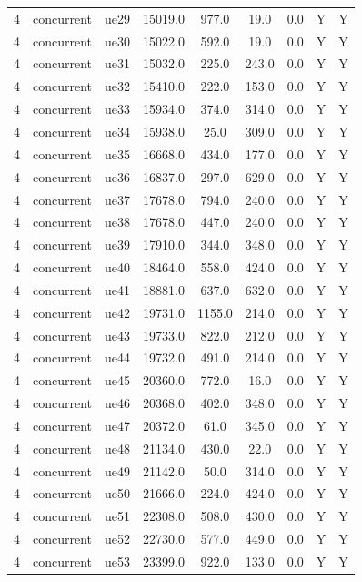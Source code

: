 \begin{table}[ht]
\begin{tabular}{|c|c|c|c|c|c|c|c|c|}
4 & concurrent & ue29 & 15019.0 & 977.0 & 19.0 & 0.0 & Y & Y \\
4 & concurrent & ue30 & 15022.0 & 592.0 & 19.0 & 0.0 & Y & Y \\
4 & concurrent & ue31 & 15032.0 & 225.0 & 243.0 & 0.0 & Y & Y \\
4 & concurrent & ue32 & 15410.0 & 222.0 & 153.0 & 0.0 & Y & Y \\
4 & concurrent & ue33 & 15934.0 & 374.0 & 314.0 & 0.0 & Y & Y \\
4 & concurrent & ue34 & 15938.0 & 25.0 & 309.0 & 0.0 & Y & Y \\
4 & concurrent & ue35 & 16668.0 & 434.0 & 177.0 & 0.0 & Y & Y \\
4 & concurrent & ue36 & 16837.0 & 297.0 & 629.0 & 0.0 & Y & Y \\
4 & concurrent & ue37 & 17678.0 & 794.0 & 240.0 & 0.0 & Y & Y \\
4 & concurrent & ue38 & 17678.0 & 447.0 & 240.0 & 0.0 & Y & Y \\
4 & concurrent & ue39 & 17910.0 & 344.0 & 348.0 & 0.0 & Y & Y \\
4 & concurrent & ue40 & 18464.0 & 558.0 & 424.0 & 0.0 & Y & Y \\
4 & concurrent & ue41 & 18881.0 & 637.0 & 632.0 & 0.0 & Y & Y \\
4 & concurrent & ue42 & 19731.0 & 1155.0 & 214.0 & 0.0 & Y & Y \\
4 & concurrent & ue43 & 19733.0 & 822.0 & 212.0 & 0.0 & Y & Y \\
4 & concurrent & ue44 & 19732.0 & 491.0 & 214.0 & 0.0 & Y & Y \\
4 & concurrent & ue45 & 20360.0 & 772.0 & 16.0 & 0.0 & Y & Y \\
4 & concurrent & ue46 & 20368.0 & 402.0 & 348.0 & 0.0 & Y & Y \\
4 & concurrent & ue47 & 20372.0 & 61.0 & 345.0 & 0.0 & Y & Y \\
4 & concurrent & ue48 & 21134.0 & 430.0 & 22.0 & 0.0 & Y & Y \\
4 & concurrent & ue49 & 21142.0 & 50.0 & 314.0 & 0.0 & Y & Y \\
4 & concurrent & ue50 & 21666.0 & 224.0 & 424.0 & 0.0 & Y & Y \\
4 & concurrent & ue51 & 22308.0 & 508.0 & 430.0 & 0.0 & Y & Y \\
4 & concurrent & ue52 & 22730.0 & 577.0 & 449.0 & 0.0 & Y & Y \\
4 & concurrent & ue53 & 23399.0 & 922.0 & 133.0 & 0.0 & Y & Y \\

\end{tabular}
\end{table}
